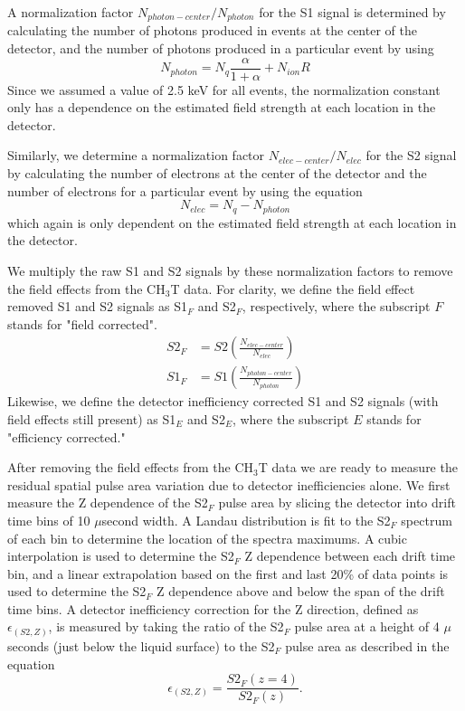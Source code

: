 \documentclass[a4paper,10pt,twocolumn]{article}
\begin{document}
A normalization factor $N_{photon-center}/N_{photon}$ for the S1 signal is determined by calculating the number of photons produced in events at the center of the detector, and the number of photons produced in a particular event by using
\begin{equation}
N_{photon} = N_q\frac{\alpha}{1+\alpha} + N_{ion}R
\end{equation}
Since we assumed a value of 2.5 keV for all events, the normalization constant only has a dependence on the estimated field strength at each location in the detector.  

Similarly, we determine a normalization factor $N_{elec-center}/N_{elec}$ for the S2 signal by calculating the number of electrons at the center of the detector and the number of electrons for a particular event by using the equation
\begin{equation}
N_{elec}=N_q-N_{photon}
\end{equation}
which again is only dependent on the estimated field strength at each location in the detector.  

We multiply the raw S1 and S2 signals by these normalization factors to remove the field effects from the CH$_3$T data.  For clarity, we define the field effect removed S1 and S2 signals as S1$_F$ and S2$_F$, respectively, where the subscript $F$ stands for "field corrected".   
\begin{align}
S2_F &=S2 \left( \frac{N_{elec-center}}{N_{elec}} \right) \\
S1_F &=S1 \left( \frac{N_{photon-center}}{N_{photon}} \right)
\end{align}
Likewise, we define the detector inefficiency corrected S1 and S2 signals (with field effects still present) as S1$_E$ and S2$_E$, where the subscript $E$ stands for "efficiency corrected."

After removing the field effects from the CH$_3$T data we are ready to measure the residual spatial pulse area variation due to detector inefficiencies alone.  We first measure the Z dependence of the S2$_F$ pulse area by slicing the detector into drift time bins of 10 $\mu$second width.  A Landau distribution is fit to the S2$_F$ spectrum of each bin to determine the location of the spectra maximums.  A cubic interpolation is used to determine the S2$_F$ Z dependence between each drift time bin, and a linear extrapolation based on the first and last 20\% of data points is used to determine the S2$_F$ Z dependence above and below the span of the drift time bins.  A detector inefficiency correction for the Z direction, defined as $\epsilon_{(S2,Z)}$, is measured by taking the ratio of the S2$_F$ pulse area at a height of 4 $\mu$seconds (just below the liquid surface) to the S2$_F$ pulse area as described in the equation
\begin{equation}
\epsilon_{(S2,Z)}= \frac{S2_F(z=4)}{S2_F(z)}.
\end{equation} 
\end{document}
